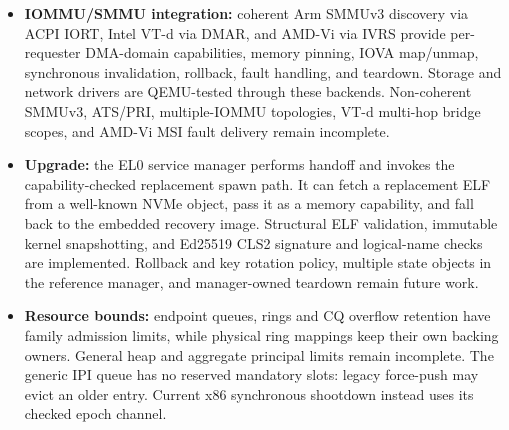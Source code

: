 \begin{itemize}
        Ordinary networked development builds provision credentials and QEMU
        forwarding for the HTTPS HTML/JSON dashboards. \texttt{--http-test}
        adds verified response validation. Protected enrolment,
        native rotation/failover and wider pressure qualification remain open, and
        SEC-10 is partial. See Chapter~\ref{chap:configuration}.
    \item \textbf{IOMMU/SMMU integration:} coherent Arm SMMUv3 discovery via
        ACPI IORT, Intel VT-d via DMAR, and AMD-Vi via IVRS provide
        per-requester DMA-domain capabilities, memory pinning, IOVA map/unmap,
        synchronous invalidation, rollback, fault handling, and teardown.
        Storage and network drivers are QEMU-tested through these backends.
        Non-coherent SMMUv3, ATS/PRI, multiple-IOMMU topologies, VT-d multi-hop
        bridge scopes, and AMD-Vi MSI fault delivery remain incomplete.
    \item \textbf{Upgrade:} the EL0 service manager performs handoff and invokes
        the capability-checked replacement spawn path. It can
        fetch a replacement ELF from a well-known NVMe object, pass it as a
        memory capability, and fall back to the embedded recovery image.
        Structural ELF validation, immutable kernel snapshotting, and Ed25519
        CLS2 signature and logical-name checks are implemented. Rollback and key
        rotation policy, multiple state objects in the reference manager, and
        manager-owned teardown remain future work.
    \item \textbf{Resource bounds:} endpoint queues, rings and CQ overflow
        retention have family admission limits, while physical ring mappings keep
        their own backing owners. General heap and aggregate principal limits
        remain incomplete. The generic IPI queue has no reserved mandatory
        slots: legacy force-push may evict an older entry. Current x86 synchronous
        shootdown instead uses its checked epoch channel.
\end{itemize}

\endinput
